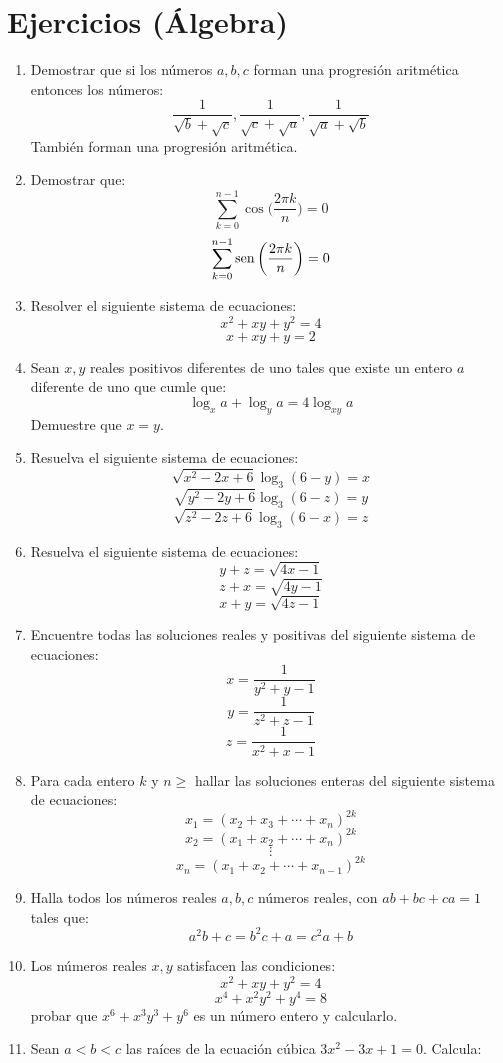\documentclass{book}
\newcommand{\sen}{\mathop{\rm sen}\nolimits} %
\begin{document}
    \section{Ejercicios (Álgebra)}
    \begin{enumerate}
        \item Demostrar que si los números $a,b,c$ forman una progresión aritmética entonces los números:
        $$\frac{1}{\sqrt{b}+\sqrt{c}},\frac{1}{\sqrt{c}+\sqrt{a}},\frac{1}{\sqrt{a}+\sqrt{b}}$$
        También forman una progresión aritmética.
        \item Demostrar que:
        $$ \sum_{k=0}^{n-1}\cos{\bigg(\frac{2\pi k}{n}\bigg)}=0$$
        $$ \sum_{k=0}^{n-1}\sen{\bigg(\frac{2\pi k}{n}\bigg)}=0$$
        \item Resolver el siguiente sistema de ecuaciones:
        $$x^2+xy+y^2=4$$
        $$x+xy+y=2$$
        \item Sean $x,y$ reales positivos diferentes de uno tales que existe un entero $a$ diferente de uno que cumle que:
        $$\log_{x}a+\log_{y}a=4\log_{xy}a$$
        Demuestre que $x=y$.
        \item Resuelva el siguiente sistema de ecuaciones:
        $$\sqrt{x^2-2x+6}\log_{3}{(6-y)}=x$$
        $$\sqrt{y^2-2y+6}\log_{3}{(6-z)}=y$$
        $$\sqrt{z^2-2z+6}\log_{3}{(6-x)}=z$$
        \item Resuelva el siguiente sistema de ecuaciones:
        $$y+z=\sqrt{4x-1}$$
        $$z+x=\sqrt{4y-1}$$
        $$x+y=\sqrt{4z-1}$$
        \item Encuentre todas las soluciones reales y positivas del siguiente sistema de ecuaciones:
        $$x=\frac{1}{y^2+y-1}$$
        $$y=\frac{1}{z^2+z-1}$$
        $$z=\frac{1}{x^2+x-1}$$
        \item Para cada entero $k$ y $n\geq$  hallar las soluciones enteras del siguiente sistema de ecuaciones:
        $$x_1={(x_2+x_3+\cdots+x_n)}^{2k}$$
        $$x_2={(x_1+x_2+\cdots+x_n)}^{2k}$$
        $$\vdots$$
        $$x_n={(x_1+x_2+\cdots+x_{n-1})}^{2k}$$
        \item Halla todos los números reales $a,b,c$ números reales, con $ab+bc+ca=1$ tales que:
        $$a^2b+c=b^2c+a=c^2a+b$$
        \item Los números reales $x,y$ satisfacen las condiciones:
        $$x^2+xy+y^2=4$$
        $$x^4+x^2y^2+y^4=8$$
        probar que $x^6 + x^3y^3 + y^6$ es un número entero y calcularlo.
        \item Sean $a < b < c$ las raíces de la ecuación cúbica $3x^2-3x+1=0$. Calcula:

\end{enumerate}
\end{document}
